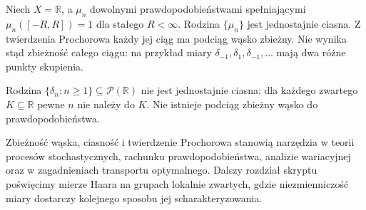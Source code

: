\begin{przyklad}
Niech $X=\mathbb R$, a $\mu_n$ dowolnymi
prawdopodobieństwami spełniającymi
$\mu_n([-R,R])=1$ dla stałego $R<\infty$.
Rodzina $\{\mu_n\}$ jest jednostajnie ciasna.
Z twierdzenia Prochorowa każdy jej ciąg ma podciąg
wąsko zbieżny. Nie wynika stąd zbieżność całego ciągu:
na przykład miary $\delta_{-1},\delta_1,\delta_{-1},\ldots$
mają dwa różne punkty skupienia.
\end{przyklad}

\begin{przyklad}
Rodzina $\{\delta_n:n\ge1\}\subseteq\mathcal P(\mathbb R)$
nie jest jednostajnie ciasna: dla każdego zwartego
$K\subseteq\mathbb R$ pewne $n$ nie należy do $K$.
Nie istnieje podciąg zbieżny wąsko do prawdopodobieństwa.
\end{przyklad}

\begin{uwaga}
Zbieżność wąska, ciasność i twierdzenie Prochorowa
stanowią narzędzia w teorii procesów stochastycznych,
rachunku prawdopodobieństwa, analizie wariacyjnej
oraz w zagadnieniach transportu optymalnego.
Dalszy rozdział skryptu poświęcimy mierze Haara
na grupach lokalnie zwartych, gdzie niezmienniczość
miary dostarczy kolejnego sposobu jej scharakteryzowania.
\end{uwaga}
